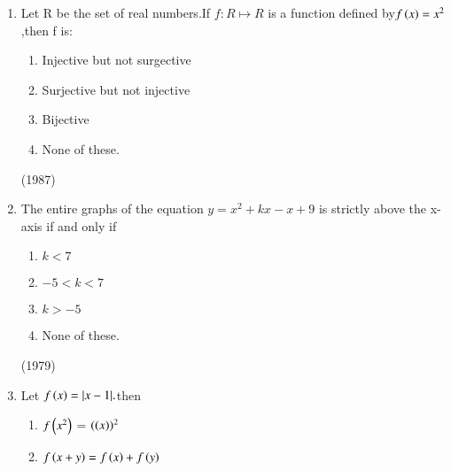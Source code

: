 \documentclass[journal]{IEEEtran}
\begin{document}
\begin{enumerate}
     


  \item Let R be the set of real numbers.If $f:R \mapsto R $ is
  a function defined by$f\left(x\right)= x^2 $,then f is:

    \begin{multicols}{2}
      \begin{enumerate}
          
        \item Injective but not surgective 
        
        \item Surjective but not injective
        
        \item Bijective
        
        \item None of these.
      \end{enumerate}
    \end{multicols}

  \hfill
  (1987)


 


  \item The entire graphs of the equation $y= x{^2}+ kx - x +9$ is strictly above the x-axis 
  if and only if
    \begin{multicols}{2}
      \begin{enumerate}
          


        \item $k<7$
        
        \item $-5<k<7$
        
        \item $k>-5$
        
        \item None of these.
      \end{enumerate}
    \end{multicols}
  \hfill
  (1979)


\item Let $f\left(x\right)=|x-1|.$then
  \begin{multicols}{2}
      \begin{enumerate}
      \item $f\left(x^2\right)$ = $(\left(x\right))^2$

      \item  $f\left(x+y\right)=f\left(x\right)+f\left(y\right)$


\end{enumerate}
\end{multicols}
\end{enumerate}
\end{document}
